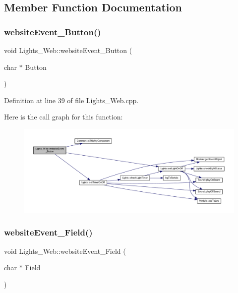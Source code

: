 \subsection{Member Function Documentation}
\mbox{\label{class_lights___web_a2437d22a7e8b027c4d08d209675f5db9}} 
\subsubsection{\texorpdfstring{website\+Event\+\_\+\+Button()}{websiteEvent\_Button()}}
{\footnotesize\ttfamily void Lights\+\_\+\+Web\+::website\+Event\+\_\+\+Button (\begin{DoxyParamCaption}\item[{char $\ast$}]{Button }\end{DoxyParamCaption})}



Definition at line 39 of file Lights\+\_\+\+Web.\+cpp.

Here is the call graph for this function\+:
\nopagebreak
\begin{figure}[H]
\begin{center}
\leavevmode
\includegraphics[width=350pt]{class_lights___web_a2437d22a7e8b027c4d08d209675f5db9_cgraph}
\end{center}
\end{figure}
\mbox{\label{class_lights___web_a8e4f0fc6e2cba4303c306910b9c9ac86}} 
\subsubsection{\texorpdfstring{website\+Event\+\_\+\+Field()}{websiteEvent\_Field()}}
{\footnotesize\ttfamily void Lights\+\_\+\+Web\+::website\+Event\+\_\+\+Field (\begin{DoxyParamCaption}\item[{char $\ast$}]{Field }\end{DoxyParamCaption})}



